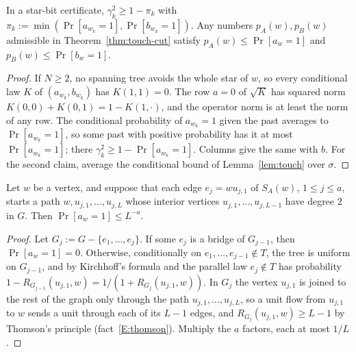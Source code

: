 \begin{lemma}\label{lem:star-limit}
In a star-bit certificate, $\gamma_k^2\ge1-\pi_k$ with $\pi_k:=\min(\Pr[a_{w_k}=1],\Pr[b_{w_k}=1])$. Any numbers $p_A(w),p_B(w)$ admissible in Theorem~\ref{thm:touch-cut} satisfy $p_A(w)\le\Pr[a_w=1]$ and $p_B(w)\le\Pr[b_w=1]$.
\end{lemma}

\begin{proof}
If $N\ge2$, no spanning tree avoids the whole star of $w$, so every conditional law $K$ of $(a_{w_k},b_{w_k})$ has $K(1,1)=0$. The row $a=0$ of $\sqrt K$ has squared norm $K(0,0)+K(0,1)=1-K(1,\cdot)$, and the operator norm is at least the norm of any row. The conditional probability of $a_{w_k}=1$ given the past averages to $\Pr[a_{w_k}=1]$, so some past with positive probability has it at most $\Pr[a_{w_k}=1]$; there $\gamma_k^2\ge1-\Pr[a_{w_k}=1]$. Columns give the same with $b$. For the second claim, average the conditional bound of Lemma~\ref{lem:touch} over $\sigma$.
\end{proof}

\begin{lemma}\label{lem:bare-path}
Let $w$ be a vertex, and suppose that each edge $e_j=wu_{j,1}$ of $S_A(w)$, $1\le j\le a$, starts a path $w,u_{j,1},\dots,u_{j,L}$ whose interior vertices $u_{j,1},\dots,u_{j,L-1}$ have degree $2$ in $G$. Then $\Pr[a_w=1]\le L^{-a}$.
\end{lemma}

\begin{proof}
Let $G_j:=G-\{e_1,\dots,e_j\}$. If some $e_j$ is a bridge of $G_{j-1}$, then $\Pr[a_w=1]=0$. Otherwise, conditionally on $e_1,\dots,e_{j-1}\notin T$, the tree is uniform on $G_{j-1}$, and by Kirchhoff's formula and the parallel law $e_j\notin T$ has probability $1-R_{G_{j-1}}(u_{j,1},w)=1/(1+R_{G_j}(u_{j,1},w))$. In $G_j$ the vertex $u_{j,1}$ is joined to the rest of the graph only through the path $u_{j,1},\dots,u_{j,L}$, so a unit flow from $u_{j,1}$ to $w$ sends a unit through each of its $L-1$ edges, and $R_{G_j}(u_{j,1},w)\ge L-1$ by Thomson's principle (fact~\ref{E:thomson}). Multiply the $a$ factors, each at most $1/L$.
\end{proof}

